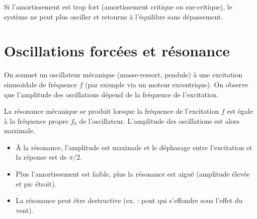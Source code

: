 \begin{remarque}
Si l'amortissement est trop fort (amortissement critique ou sur-critique), le système ne peut plus osciller et retourne à l'équilibre sans dépassement.
\end{remarque}

\section{Oscillations forcées et résonance}

\begin{experience}
On soumet un oscillateur mécanique (masse-ressort, pendule) à une excitation sinusoïdale de fréquence $f$ (par exemple via un moteur excentrique). On observe que l'amplitude des oscillations dépend de la fréquence de l'excitation.
\end{experience}

\begin{definition}[Résonance]
La résonance mécanique se produit lorsque la fréquence de l'excitation $f$ est égale à la fréquence propre $f_0$ de l'oscillateur. L'amplitude des oscillations est alors maximale.
\end{definition}

\begin{illus}
\end{illus}

\begin{aretenir}
\begin{itemize}
    \item À la résonance, l'amplitude est maximale et le déphasage entre l'excitation et la réponse est de $\pi/2$.
    \item Plus l'amortissement est faible, plus la résonance est aiguë (amplitude élevée et pic étroit).
    \item La résonance peut être destructive (ex. : pont qui s'effondre sous l'effet du vent).
\end{itemize}
\end{aretenir}

